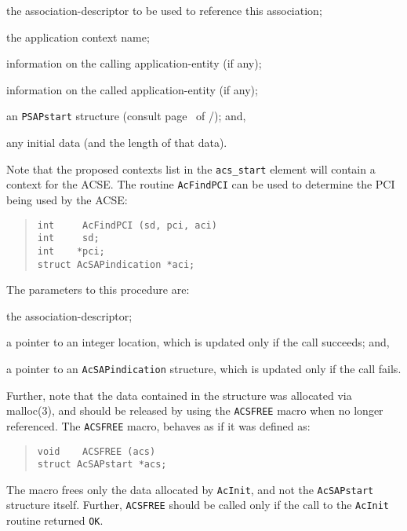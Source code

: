 \begin{describe}
\item[\verb"acs\_sd":] the association-descriptor to be used to reference
this association;

\item[\verb"acs\_context":] the application context name;

\item[\verb"acs\_callingtitle":] information on the calling application-entity
(if any); 

\item[\verb"acs\_calledtitle":] information on the called application-entity
(if any);

\item[\verb"acs\_start":] an \verb"PSAPstart" structure
(consult page~\pageref{PSAPstart} of \voltwo/);
and,

\item[\verb"acs\_info"/\verb"acs\_ninfo":] any initial data
(and the length of that data).
\end{describe}
Note that the proposed contexts list in the \verb"acs_start" element will
contain a context for the ACSE.
The routine \verb"AcFindPCI" can be used to determine the PCI being used by
the ACSE:
\begin{quote}\small\begin{verbatim}
int     AcFindPCI (sd, pci, aci)
int     sd;
int    *pci;
struct AcSAPindication *aci;
\end{verbatim}\end{quote}
The parameters to this procedure are:
\begin{describe}
\item[\verb"sd":] the association-descriptor;

\item[\verb"pci":] a pointer to an integer location,
which is updated only if the call succeeds;
and,

\item[\verb"aci":] a pointer to an \verb"AcSAPindication" structure,
which is updated only if the call fails.
\end{describe}

Further,
note that the data contained in the structure was allocated via \man malloc(3),
and should be released by using the \verb"ACSFREE" macro when no longer
referenced.
The \verb"ACSFREE" macro,
behaves as if it was defined as:\label{ACSFREE}
\begin{quote}\small\begin{verbatim}
void    ACSFREE (acs)
struct AcSAPstart *acs;
\end{verbatim}\end{quote}
The macro frees only the data allocated by \verb"AcInit",
and not the \verb"AcSAPstart" structure itself.
Further,
\verb"ACSFREE" should be called only if the call to the \verb"AcInit"
routine returned \verb"OK".

